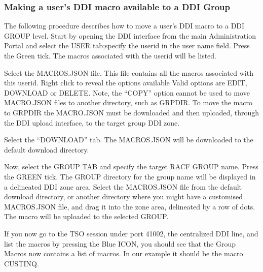 \documentclass[letterpaper,10pt,english]{sphinxmanual}
\begin{document}
\ignorespaces 

\subsubsection{Making a user’s DDI macro available to a DDI Group}
\label{\detokenize{Customization:making-a-user-s-ddi-macro-available-to-a-ddi-group}}\label{\detokenize{Customization:index-91}}
\sphinxAtStartPar
The following procedure describes how to move a user’s DDI macro to a DDI GROUP level. Start by opening the DDI interface from the main Administration Portal and select the USER tab;specify the userid in the user name field. Press the Green tick. The macros associated with the userid will be listed.

\sphinxAtStartPar
{}

\sphinxAtStartPar
{}

\sphinxAtStartPar
Select the MACROS.JSON file. This file contains all the macros associated with this userid. Right click to reveal the options available \sphinxhyphen{} Valid options are EDIT, DOWNLOAD or DELETE.
Note, the “COPY” option cannot be used to move MACRO.JSON files to another directory, such as GRP\sphinxhyphen{}DIR. To move the macro to GRP\sphinxhyphen{}DIR the MACRO.JSON must be downloaded and then uploaded, through the DDI upload interface, to the target group DDI zone.

\sphinxAtStartPar
Select the “DOWNLOAD” tab. The MACROS.JSON will be downloaded to the default download directory.

\sphinxAtStartPar
Now, select the GROUP TAB and specify the target RACF GROUP name. Press the GREEN tick. The GROUP directory for the group name will be displayed in a delineated DDI zone area. Select the MACROS.JSON file from the default download directory, or another directory where you might have a customised MACROS.JSON file, and drag it into the zone area, delineated by a row of dots. The macro will be uploaded to the selected GROUP.

\sphinxAtStartPar
If you now go to the TSO session under port 41002, the centralized DDI line, and list the macros by pressing the Blue ICON, you should see that the Group Macros now contains a list of macros. In our example it should be the macro CUSTINQ.
\end{document}
